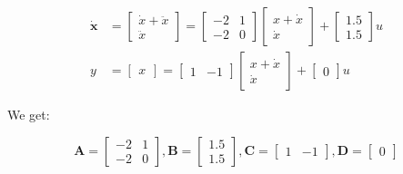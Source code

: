     \begin{align}
        \dot{\textbf{x}} &=
        \begin{bmatrix}
            \dot{x} + \ddot{x}\\
            \ddot{x}
        \end{bmatrix} = 
        \begin{bmatrix}
            -2 & 1 \\
            -2 & 0
        \end{bmatrix}
        \begin{bmatrix}
            x + \dot{x}\\
            \dot{x}
        \end{bmatrix} + 
        \begin{bmatrix}
            1.5\\
            1.5
        \end{bmatrix}
        u
        \\
        y&=
        \begin{bmatrix}
            x
        \end{bmatrix} =
        \begin{bmatrix}
            1 & -1
        \end{bmatrix}
        \begin{bmatrix}
            x + \dot{x}\\
            \dot{x}
        \end{bmatrix} + 
        \begin{bmatrix}
            0
        \end{bmatrix}
        u
    \end{align}

    We get:

    \begin{equation}
        \textbf{A} =
        \begin{bmatrix}
            -2 & 1 \\
            -2 & 0
        \end{bmatrix}, 
        \textbf{B} =
        \begin{bmatrix}
            1.5\\
            1.5
        \end{bmatrix}, 
        \textbf{C} =
        \begin{bmatrix}
            1 & -1
        \end{bmatrix}, 
        \textbf{D} =
        \begin{bmatrix}
            0
        \end{bmatrix}
    \end{equation}
    

